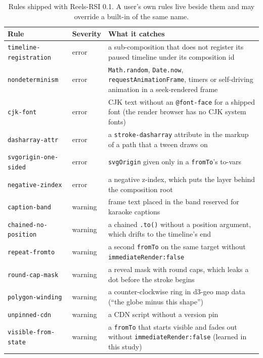 \documentclass[11pt]{article}
\newcommand{\sys}{Reels-RSI}
\begin{document}
\begin{table}[h]
\centering\small
\begin{tabular}{llp{9.6cm}}
\toprule
Rule & Severity & What it catches \\
\midrule
\texttt{timeline-registration} & error & a sub-composition that does not register its paused timeline under its composition id \\
\texttt{nondeterminism} & error & \texttt{Math.random}, \texttt{Date.now}, \texttt{requestAnimationFrame}, timers or self-driving animation in a seek-rendered frame \\
\texttt{cjk-font} & error & CJK text without an \texttt{@font-face} for a shipped font (the render browser has no CJK system fonts) \\
\texttt{dasharray-attr} & error & a \texttt{stroke-dasharray} attribute in the markup of a path that a tween draws on \\
\texttt{svgorigin-one-sided} & error & \texttt{svgOrigin} given only in a \texttt{fromTo}'s to-vars \\
\texttt{negative-zindex} & error & a negative z-index, which puts the layer behind the composition root \\
\texttt{caption-band} & warning & frame text placed in the band reserved for karaoke captions \\
\texttt{chained-no-position} & warning & a chained \texttt{.to()} without a position argument, which drifts to the timeline's end \\
\texttt{repeat-fromto} & warning & a second \texttt{fromTo} on the same target without \texttt{immediateRender:false} \\
\texttt{round-cap-mask} & warning & a reveal mask with round caps, which leaks a dot before the stroke begins \\
\texttt{polygon-winding} & warning & a counter-clockwise ring in d3-geo map data (``the globe minus this shape'') \\
\texttt{unpinned-cdn} & warning & a CDN script without a version pin \\
\texttt{visible-from-state} & warning & a \texttt{fromTo} that starts visible and fades out without \texttt{immediateRender:false} (learned in this study) \\
\bottomrule
\end{tabular}
\caption{Rules shipped with \sys{} 0.1. A user's own rules live beside them and may override a
built-in of the same name.}
\end{table}
\end{document}
